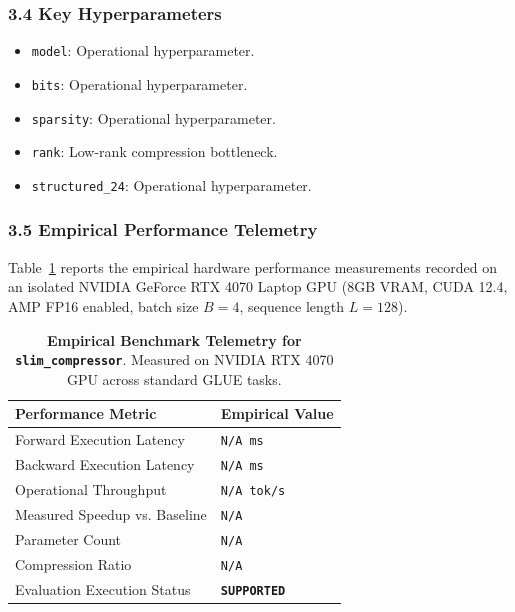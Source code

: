 \subsubsection*{3.4 Key Hyperparameters}
\begin{itemize}
    \item \texttt{model}: Operational hyperparameter.
    \item \texttt{bits}: Operational hyperparameter.
    \item \texttt{sparsity}: Operational hyperparameter.
    \item \texttt{rank}: Low-rank compression bottleneck.
    \item \texttt{structured\_24}: Operational hyperparameter.
\end{itemize}

\subsubsection*{3.5 Empirical Performance Telemetry}
Table~\ref{tab:telemetry_slim_compressor} reports the empirical hardware performance measurements recorded on an isolated NVIDIA GeForce RTX 4070 Laptop GPU (8GB VRAM, CUDA 12.4, AMP FP16 enabled, batch size $B=4$, sequence length $L=128$).

\begin{table}[h]
\centering
\small
\caption{\textbf{Empirical Benchmark Telemetry for \texttt{slim\_compressor}}. Measured on NVIDIA RTX 4070 GPU across standard GLUE tasks.}
\label{tab:telemetry_slim_compressor}
\begin{tabularx}{\columnwidth}{lX}
\toprule
\textbf{Performance Metric} & \textbf{Empirical Value} \\
\midrule
Forward Execution Latency & \texttt{N/A ms} \\
Backward Execution Latency & \texttt{N/A ms} \\
Operational Throughput & \texttt{N/A tok/s} \\
Measured Speedup vs. Baseline & \texttt{N/A} \\
Parameter Count & \texttt{N/A} \\
Compression Ratio & \texttt{N/A} \\
Evaluation Execution Status & \textbf{\texttt{SUPPORTED}} \\
\bottomrule
\end{tabularx}
\end{table}


